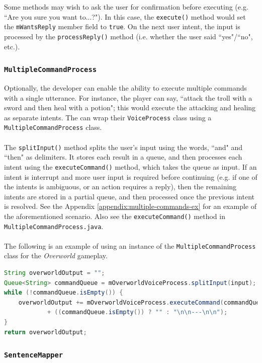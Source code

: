\documentclass[11pt]{article}
\begin{document}
Some methods may wish to ask the user for confirmation before executing (e.g. ``Are you sure you want to...?"). In this case, the \texttt{execute()} method would set the \texttt{mWantsReply} member field to \texttt{true}. On the next user intent, the input is processed by the \texttt{processReply()} method (i.e. whether the user said ``yes"/``no", etc.).

\subsubsection{\texttt{MultipleCommandProcess}}

Optionally, the developer can enable the ability to execute multiple commands with a single utterance. For instance, the player can say, ``attack the troll with a sword and then heal with a potion"; this would execute the attacking and healing as separate intents. The can wrap their \texttt{VoiceProcess} class using a \texttt{MultipleCommandProcess} class.
\\
\\
The \texttt{splitInput()} method splits the user's input using the words, ``and" and ``then" as delimiters. It stores each result in a queue, and then processes each intent using the \texttt{executeCommand()} method, which takes the queue as input. If an intent is interrupt and more user input is required before continuing (e.g. if one of the intents is ambiguous, or an action requires a reply), then the remaining intents are stored in a partial queue, and then processed once the previous intent is resolved. See the Appendix \ref{appendix:multiple-commands-ex} for an example of the aforementioned scenario. Also see the \texttt{executeCommand()} method in \texttt{MultipleCommandProcess.java}.
\\
\\
The following is an example of using an instance of the \texttt{MultipleCommandProcess} class for the \textit{Overworld} gameplay.

\begin{lstlisting}[language=Java]
String overworldOutput = "";
Queue<String> commandQueue = mOverworldVoiceProcess.splitInput(input);
while (!commandQueue.isEmpty()) {
    overworldOutput += mOverworldVoiceProcess.executeCommand(commandQueue)
            + ((commandQueue.isEmpty()) ? "" : "\n\n---\n\n");
}
return overworldOutput;
\end{lstlisting}

\subsubsection{\texttt{SentenceMapper}}
\end{document}
